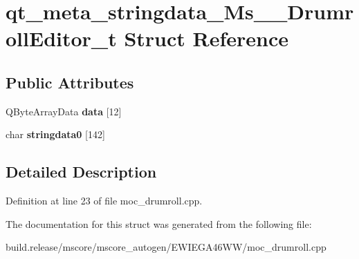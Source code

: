 \hypertarget{structqt__meta__stringdata___ms_____drumroll_editor__t}{}\section{qt\+\_\+meta\+\_\+stringdata\+\_\+\+Ms\+\_\+\+\_\+\+Drumroll\+Editor\+\_\+t Struct Reference}
\label{structqt__meta__stringdata___ms_____drumroll_editor__t}
\subsection*{Public Attributes}
\begin{DoxyCompactItemize}
\item 
\mbox{\label{structqt__meta__stringdata___ms_____drumroll_editor__t_a0b884b674968493e05e42d2a4673f81b}} 
Q\+Byte\+Array\+Data {\bfseries data} \mbox{[}12\mbox{]}
\item 
\mbox{\label{structqt__meta__stringdata___ms_____drumroll_editor__t_a5b8a1b51ac3dafaf16da603d5c6b1fdf}} 
char {\bfseries stringdata0} \mbox{[}142\mbox{]}
\end{DoxyCompactItemize}


\subsection{Detailed Description}


Definition at line 23 of file moc\+\_\+drumroll.\+cpp.



The documentation for this struct was generated from the following file\+:\begin{DoxyCompactItemize}
\item 
build.\+release/mscore/mscore\+\_\+autogen/\+E\+W\+I\+E\+G\+A46\+W\+W/moc\+\_\+drumroll.\+cpp\end{DoxyCompactItemize}
